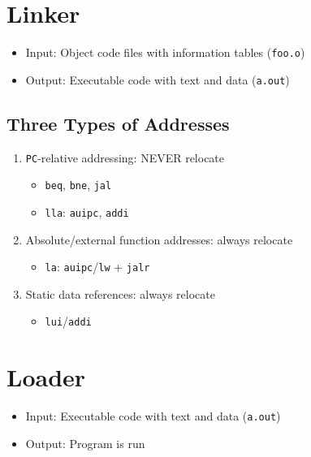 \section{Linker}
\begin{itemize}
    \item Input: Object code files with information tables (\texttt{foo.o})
    \item Output: Executable code with text and data (\texttt{a.out})
\end{itemize}

\subsection{Three Types of Addresses}
\begin{enumerate}
		\item \texttt{PC}-relative addressing: NEVER relocate
			\begin{itemize}
				\item \texttt{beq}, \texttt{bne}, \texttt{jal}
				\item \texttt{lla}: \texttt{auipc}, \texttt{addi}
			\end{itemize}
		\item Absolute/external function addresses: always relocate
			\begin{itemize}
				\item \texttt{la}: \texttt{auipc}/\texttt{lw} + \texttt{jalr}
			\end{itemize}
		\item Static data references: always relocate
			\begin{itemize}
				\item \texttt{lui}/\texttt{addi}
			\end{itemize}
\end{enumerate}

\section{Loader}
\begin{itemize}
    \item Input: Executable code with text and data (\texttt{a.out})
    \item Output: Program is run
\end{itemize}

